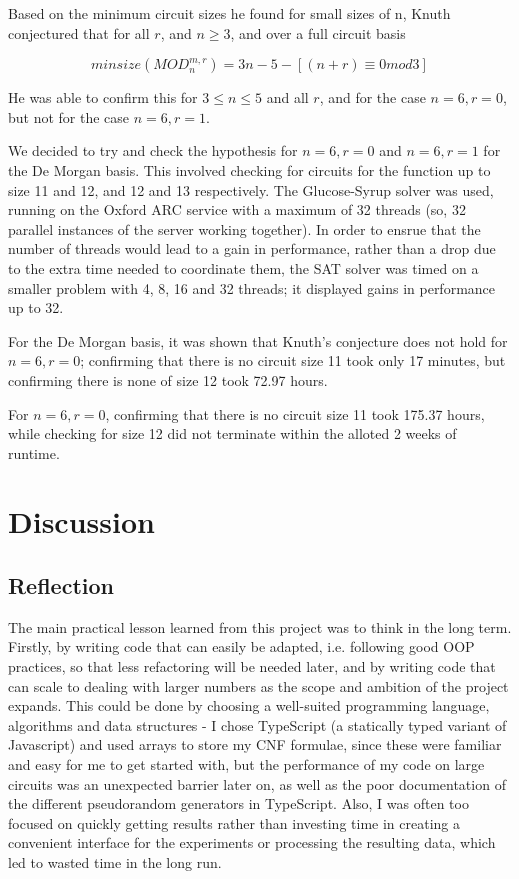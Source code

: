 \documentclass{article}
\begin{document}
Based on the minimum circuit sizes he found for small sizes of n, Knuth conjectured that for all $r$, and $n \geq 3$, and over a full circuit basis

\[
  minsize(MOD^{m,r}_n) = 3n - 5 - [(n+r) \equiv 0 mod 3]  
\]

He was able to confirm this for $3 \leq n \leq 5$ and all $r$, and for the case $n=6, r=0$, but not for the case $n=6, r=1$.

We decided to try and check the hypothesis for $n=6, r=0$ and $n=6, r=1$ for the De Morgan basis. This involved checking for circuits for the function up to size 11 and 12, and 12 and 13 respectively. The Glucose-Syrup solver was used, running on the Oxford ARC service with a maximum of 32 threads (so, 32 parallel instances of the server working together). In order to ensrue that the number of threads would lead to a gain in performance, rather than a drop due to the extra time needed to coordinate them, the SAT solver was timed on a smaller problem with 4, 8, 16 and 32 threads; it displayed gains in performance up to 32. 

For the De Morgan basis, it was shown that Knuth's conjecture does not hold for $n=6, r=0$; confirming that there is no circuit size 11 took only 17 minutes, but confirming there is none of size 12 took 72.97 hours.

For $n=6, r=0$, confirming that there is no circuit size 11 took 175.37 hours, while checking for size 12 did not terminate within the alloted 2 weeks of runtime.

\section{Discussion}

\subsection{Reflection}

The main practical lesson learned from this project was to think in the long term. Firstly, by writing code that can easily be adapted, i.e. following good OOP practices, so that less refactoring will be needed later, and by writing code that can scale to dealing with larger numbers as the scope and ambition of the project expands. This could be done by choosing a well-suited programming language, algorithms and data structures - I chose TypeScript (a statically typed variant of Javascript) and used arrays to store my CNF formulae, since these were familiar and easy for me to get started with, but the performance of my code on large circuits was an unexpected barrier later on, as well as the poor documentation of the different pseudorandom generators in TypeScript. Also, I was often too focused on quickly getting results rather than investing time in creating a convenient interface for the experiments or processing the resulting data, which led to wasted time in the long run.
\end{document}
